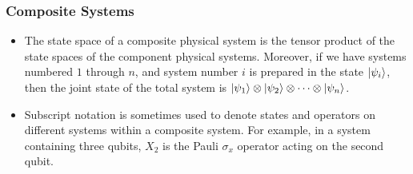 \documentclass{article}
\begin{document}
\subsubsection{Composite Systems}

\begin{itemize}
  \item The state space of a composite physical system is the tensor product of the state spaces of the component physical systems. Moreover, if we have systems numbered $1$ through $n$, and system number $i$ is prepared in the state $\ket{\psi_i}$, then the joint state of the total system is $\ket{\psi_1} \otimes \ket{\psi_2} \otimes \cdots \otimes \ket{\psi_n}$.

  \item Subscript notation is sometimes used to denote states and operators on different systems within a composite system. For example, in a system containing three qubits, $X_2$ is the Pauli $\sigma_x$ operator acting on the second qubit.
\end{itemize}
\end{document}
